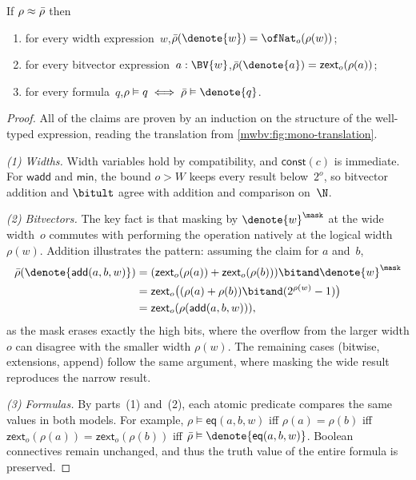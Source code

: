\begin{lemma}[Correspondence]\label{mwbv:lem:correspondence}
If $\rho \approx \bar{\rho}$ then
\begin{enumerate}
  \item for every width expression~$w$,\quad $\rhob(\denote{w}) = \ofNat_o(\rho(w))$;
  \item for every bitvector expression~$a : \BV{w}$,\quad $\rhob(\denote{a}) = \mathsf{zext}_o(\rho(a))$;
  \item for every formula~$q$,\quad $\rho \vDash q \iff \rhob \vDash \denote{q}$.
\end{enumerate}
\end{lemma}
\begin{proof}
All of the claims are proven by an induction on the structure of the well-typed expression,
reading the translation from \cref{mwbv:fig:mono-translation}.

\emph{(1) Widths.} Width variables hold by compatibility, and
$\textsf{const}(c)$ is immediate. For $\textsf{wadd}$ and $\textsf{min}$, the
bound $o > W$ keeps every result below~$2^o$, so bitvector addition and
$\bitult$ agree with addition and comparison on~$\N$.

\emph{(2) Bitvectors.} The key fact is that masking by $\denote{w}^\mask$ at the
wide width~$o$ commutes with performing the operation natively at the logical
width~$\rho(w)$. Addition illustrates the pattern: assuming the claim for $a$
and~$b$,
\noindent
\begin{align*}
  \rhob(\denote{\textsf{add}(a,b,w)}) &= (\mathsf{zext}_o(\rho(a)) + \mathsf{zext}_o(\rho(b))) \bitand \denote{w}^\mask \\
  &= \mathsf{zext}_o\big((\rho(a) + \rho(b)) \bitand (2^{\rho(w)} - 1)\big) \\
  &= \mathsf{zext}_o(\rho(\textsf{add}(a,b,w))),
\end{align*}
as the mask erases exactly the high bits, where the overflow from the larger width $o$
can disagree with the smaller width $\rho(w)$. The remaining cases (bitwise, extensions, append)
follow the same argument, where masking the wide result reproduces the narrow result.

\emph{(3) Formulas.} By parts~(1) and~(2), each atomic predicate compares the
same values in both models. For example, $\rho \vDash \textsf{eq}(a,b,w)$ iff
$\rho(a) = \rho(b)$ iff $\mathsf{zext}_o(\rho(a)) = \mathsf{zext}_o(\rho(b))$ iff
$\rhob \vDash \denote{\textsf{eq}(a,b,w)}$. Boolean connectives
remain unchanged, and thus the truth value of the entire formula is preserved.
\end{proof}

